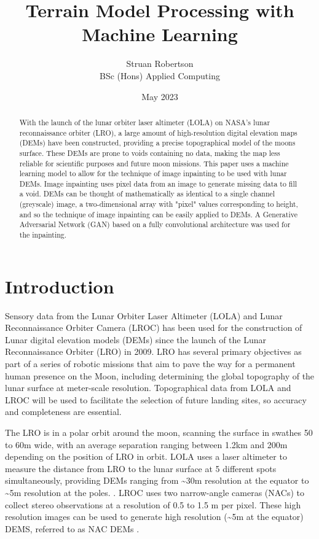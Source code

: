\documentclass[twocolumn]{article}
\author{Struan Robertson \\ BSc (Hons) Applied Computing}
\date{May 2023}
\title{Terrain Model Processing with Machine Learning}
\begin{document}
\maketitle
\begin{abstract}

With the launch of the lunar orbiter laser altimeter (LOLA) on NASA's lunar reconnaissance orbiter (LRO), a large amount of high-resolution digital elevation maps (DEMs) have been constructed, providing a precise topographical model of the moons surface.
These DEMs are prone to voids containing no data, making the map less reliable for scientific purposes and future moon missions.
This paper uses a machine learning model to allow for the technique of image inpainting to be used with lunar DEMs.
Image inpainting uses pixel data from an image to generate missing data to fill a void.
DEMs can be thought of mathematically as identical to a single channel (greyscale) image, a two-dimensional array with "pixel" values corresponding to height, and so the technique of image inpainting can be easily applied to DEMs.
A Generative Adversarial Network (GAN) based on a fully convolutional architecture was used for the inpainting.


\end{abstract}

\section{Introduction}
\label{sec:org42968f7}

Sensory data from the Lunar Orbiter Laser Altimeter (LOLA) and Lunar Reconnaissance Orbiter Camera (LROC) has been used for the construction of Lunar digital elevation models (DEMs) since the launch of the Lunar Reconnaissance Orbiter (LRO) in 2009.
LRO has several primary objectives as part of a series of robotic missions that aim to pave the way for a permanent human presence on the Moon, including determining the global topography of the lunar surface at meter-scale resolution.
Topographical data from LOLA and LROC will be used to facilitate the selection of future landing sites, so accuracy and completeness are essential.
\autocite{chinLunarReconnaissanceOrbiter2007}

The LRO is in a polar orbit around the moon, scanning the surface in swathes 50 to 60m wide, with an average separation ranging between 1.2km and 200m depending on the position of LRO in orbit.
LOLA uses a laser altimeter to measure the distance from LRO to the lunar surface at 5 different spots simultaneously, providing DEMs ranging from \textasciitilde{}30m resolution at the equator to \textasciitilde{}5m resolution at the poles. \autocite{smithLunarOrbiterLaser2010}.
LROC uses two narrow-angle cameras (NACs) to collect stereo observations at a resolution of 0.5 to 1.5 m per pixel.
These high resolution images can be used to generate high resolution (\textasciitilde{}5m at the equator) DEMS, referred to as NAC DEMs \autocite{tranGeneratingDigitalTerrain2010}.
\end{document}
